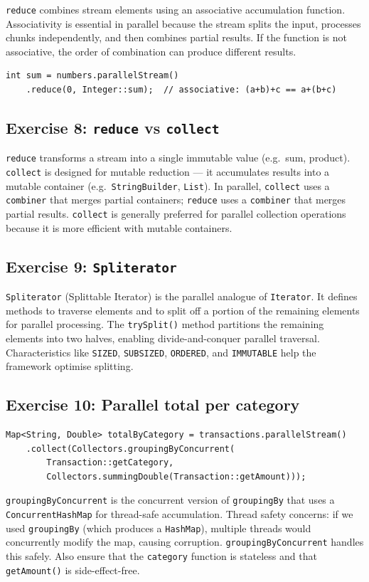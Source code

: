 \documentclass[twoside=false,DIV=14]{scrartcl}
\begin{document}
\texttt{reduce} combines stream elements using an associative accumulation function.  Associativity is essential in parallel because the stream splits the input, processes chunks independently, and then combines partial results.  If the function is not associative, the order of combination can produce different results.

\begin{lstlisting}
int sum = numbers.parallelStream()
    .reduce(0, Integer::sum);  // associative: (a+b)+c == a+(b+c)
\end{lstlisting}

\subsection*{Exercise 8: \texttt{reduce} vs \texttt{collect}}

\texttt{reduce} transforms a stream into a single immutable value (e.g.\ sum, product).  \texttt{collect} is designed for mutable reduction --- it accumulates results into a mutable container (e.g.\ \texttt{StringBuilder}, \texttt{List}).  In parallel, \texttt{collect} uses a \texttt{combiner} that merges partial containers; \texttt{reduce} uses a \texttt{combiner} that merges partial results.  \texttt{collect} is generally preferred for parallel collection operations because it is more efficient with mutable containers.

\subsection*{Exercise 9: \texttt{Spliterator}}

\texttt{Spliterator} (Splittable Iterator) is the parallel analogue of \texttt{Iterator}.  It defines methods to traverse elements and to split off a portion of the remaining elements for parallel processing.  The \texttt{trySplit()} method partitions the remaining elements into two halves, enabling divide-and-conquer parallel traversal.  Characteristics like \texttt{SIZED}, \texttt{SUBSIZED}, \texttt{ORDERED}, and \texttt{IMMUTABLE} help the framework optimise splitting.

\subsection*{Exercise 10: Parallel total per category}

\begin{lstlisting}
Map<String, Double> totalByCategory = transactions.parallelStream()
    .collect(Collectors.groupingByConcurrent(
        Transaction::getCategory,
        Collectors.summingDouble(Transaction::getAmount)));
\end{lstlisting}

\texttt{groupingByConcurrent} is the concurrent version of \texttt{groupingBy} that uses a \texttt{ConcurrentHashMap} for thread-safe accumulation.  Thread safety concerns: if we used \texttt{groupingBy} (which produces a \texttt{HashMap}), multiple threads would concurrently modify the map, causing corruption.  \texttt{groupingByConcurrent} handles this safely.  Also ensure that the \texttt{category} function is stateless and that \texttt{getAmount()} is side-effect-free.
\end{document}
